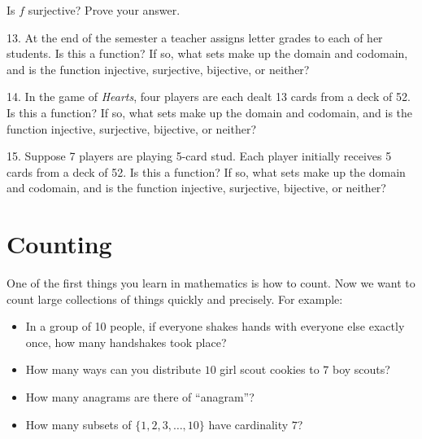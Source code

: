 \documentclass[10pt,]{memoir}
\theoremstyle{plain}
\theoremstyle{definition}
\theoremstyle{definition}
\theoremstyle{definition}
\numberwithin{equation}{chapter}
\begin{document}
\begin{exerciselist}
\begin{enumerate}[label=(\alph*)]
                Is \(f\) surjective? Prove your answer.
\end{enumerate}
\par\smallskip
\item[13.]\hypertarget{exercise-39}{}
            At the end of the semester a teacher assigns letter grades to each of her students. Is this a function? If so, what sets make up the domain and codomain, and is the function injective, surjective, bijective, or neither?
\par\smallskip
\item[14.]\hypertarget{exercise-40}{}
            In the game of \emph{Hearts}, four players are each dealt 13 cards from a deck of 52. Is this a function? If so, what sets make up the domain and codomain, and is the function injective, surjective, bijective, or neither?
\par\smallskip
\item[15.]\hypertarget{exercise-41}{}
            Suppose 7 players are playing 5-card stud. Each player initially receives 5 cards from a deck of 52. Is this a function? If so, what sets make up the domain and codomain, and is the function injective, surjective, bijective, or neither?
\par\smallskip
\end{exerciselist}
\typeout{************************************************}
\typeout{************************************************}
\chapter[Counting]{Counting}\label{ch_counting}
\typeout{************************************************}
\typeout{************************************************}

One of the first things you learn in mathematics is how to count. Now we want to count large collections of things quickly and precisely. For example:
%
\leavevmode%
\begin{itemize}[label=\textbullet]
\item{}
In a group of 10 people, if everyone shakes hands with everyone else exactly once, how many handshakes took place?
%
\item{}
How many ways can you distribute \(10\) girl scout cookies to \(7\) boy scouts?
%
\item{}
How many anagrams are there of ``anagram''?
%
\item{}
How many subsets of \(\{1,2,3,\ldots, 10\}\) have cardinality \(7\)?
%
\end{itemize}
\par
\end{document}
